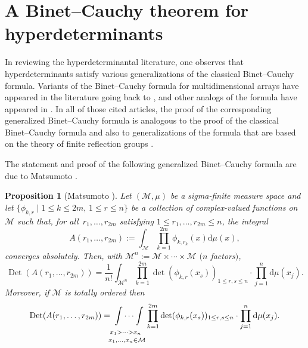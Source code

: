 \documentclass[10pt,a4paper]{amsart}
\numberwithin{equation}{section}
\newtheorem{Proposition}[Theorem]{Proposition}
 { \theoremstyle{definition}
\newtheorem{Definition}[Theorem]{Definition}
\newtheorem{Note}[Theorem]{Note}
\newtheorem{Example}[Theorem]{Example}
\newtheorem{Remark}[Theorem]{Remark} }
\def\dd{ \mathrm{d}}
\def\Det{\operatorname{Det}}
\def\mcalM{\mathcal{M}}
\begin{document}
\section{A Binet--Cauchy theorem for hyperdeterminants}
\label{sec_BC_for_hyperdets}

In reviewing the hyperdeterminantal literature, one observes that hyperdeterminants satisfy various generalizations of the classical Binet--Cauchy formula. Variants of the Binet--Cauchy formula for multidimensional arrays have appeared in the literature going back to \cite{gasparyan,hval}, and other analogs of the formula have appeared in \cite{barvinok,boussicault,dionisi,evans,karlinrinott88,matsumoto}. In all of those cited articles, the proof of the corresponding generalized Binet--Cauchy formula is analogous to the proof of the classical Binet--Cauchy formula \cite{Karlin} and also to generalizations of the formula that are based on the theory of finite reflection groups \cite{grossrichards89,grossrichards95}.

The statement and proof of the following generalized Binet--Cauchy formula are due to Matsumoto \cite[Proposition 2.1]{matsumoto}.


\begin{Proposition}[Matsumoto \cite{matsumoto}]
\label{prop_binet_cauchy}
Let $(\mcalM,\mu)$ be a sigma-finite measure space and let $\{\phi_{k,r}\mid\allowbreak 1 \le k \le 2m,\, 1 \le r \le n\}$ be a collection of complex-valued functions on $\mcalM$ such that, for all~${r_1,\dots,r_{2m}}$ satisfying $1 \le r_1,\dots,r_{2m} \le n$, the integral
\begin{equation}
A(r_1,\dots,r_{2m}) := \int_\mcalM \prod_{k=1}^{2m} \phi_{k,r_k}(x) \dd\mu(x),\label{BCkernel}
\end{equation}
converges absolutely. Then, with $\mcalM^n := \mcalM \times \cdots \times \mcalM$ $(n$ factors$)$,
\begin{equation}
\Det(A(r_1,\dots,r_{2m})) = \frac{1}{n!} \int_{\mcalM^n} \prod_{k=1}^{2m} \det(\phi_{k,r}(x_s))_{1 \le r,s \le n} \cdot \prod_{j=1}^n \dd\mu(x_j).\label{binetcauchy1}
\end{equation}
Moreover, if $\mcalM$ is totally ordered then
\begin{equation}
\Det(A(r_1,\dots,r_{2m})) = \idotsint\limits_{\substack{x_1 > \cdots > x_n {\phantom{\big|}}\\ x_1,\dots,x_n \in \mcalM}} \prod_{k=1}^{2m} \det(\phi_{k,r}(x_s))_{1 \le r,s \le n} \cdot \prod_{j=1}^n \dd\mu(x_j).\label{binetcauchy2}
\end{equation}
\end{Proposition}
\end{document}

